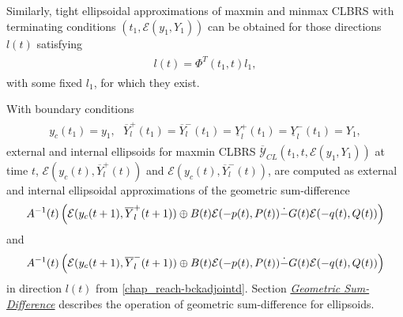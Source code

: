 \documentclass[letterpaper,10pt,english]{sphinxmanual}
\begin{document}
Similarly, tight ellipsoidal approximations of maxmin and minmax CLBRS
with terminating conditions $(t_1, {\mathcal E}(y_1,Y_1))$ can be
obtained for those directions $l(t)$ satisfying
\label{chap_reach:equation-bckadjointd}\begin{gather}
\begin{split}l(t) = \Phi^T(t_1,t)l_1,\end{split}\label{chap_reach-bckadjointd}
\end{gather}
with some fixed $l_1$, for which they exist.

With boundary conditions
\label{chap_reach:equation-bndconds}\begin{gather}
\begin{split}y_c(t_1)=y_1, ~~~ \overline{Y}^+_l(t_1)=\overline{Y}^-_l(t_1)=\underline{Y}^+_l(t_1)=\underline{Y}^-_l(t_1)=Y_1,\end{split}\label{chap_reach-bndconds}
\end{gather}
external and internal ellipsoids for maxmin CLBRS
$\overline{{\mathcal Y}}_{CL}(t_1,t,{\mathcal E}(y_1,Y_1))$ at
time $t$, ${\mathcal E}(y_c(t),\overline{Y}^+_l(t))$ and
${\mathcal E}(y_c(t),\overline{Y}^-_l(t))$, are computed as
external and internal ellipsoidal approximations of the geometric
sum-difference
\begin{gather}
\begin{split}A^{-1}(t)\left(
{\mathcal E}(y_c(t+1),\overline{Y}^+_l(t+1)) \oplus B(t){\mathcal E}(-p(t),P(t))
\dot{-}G(t){\mathcal E}(-q(t),Q(t))
\right)\end{split}\notag
\end{gather}
and
\begin{gather}
\begin{split}A^{-1}(t)\left(
{\mathcal E}(y_c(t+1),\overline{Y}^-_l(t+1)) \oplus B(t){\mathcal E}(-p(t),P(t))
\dot{-}G(t){\mathcal E}(-q(t),Q(t))
\right)\end{split}\notag
\end{gather}
in direction $l(t)$ from \eqref{chap_reach-bckadjointd}. Section
{\hyperref[chap_ellcalc:sum-diff-label]{\emph{Geometric Sum-Difference}}} describes the operation of geometric
sum-difference for ellipsoids.
\end{document}

